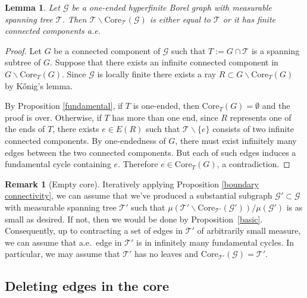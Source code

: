 \documentclass[letterpaper,11pt,reqno]{amsart}
\theoremstyle{bfnote}
\newtheorem{lemma}[theorem]{Lemma}
\theoremstyle{definition}
\newtheorem{remark}[theorem]{Remark}
\newcommand{\0}{\varnothing}
\numberwithin{equation}{section}
\begin{document}
\begin{lemma}\label{nocore}
    Let $\mathcal{G}$ be a one-ended hyperfinite Borel graph with measurable spanning tree $\mathcal{T}$. Then {$\mathcal T \backslash \mathrm{Core}_{\mathcal{T}}(\mathcal{G})$} is either equal to $\mathcal{T}$ or it has finite connected components a.e.
\end{lemma}
\begin{proof}
    Let $G$ be a connected component of $\mathcal G$ such that $T := G\cap \mathcal T$ is a spanning subtree of $G$. Suppose that there exists an infinite connected component in $G\backslash \mathrm{Core}_{T}(G)$. Since $\mathcal G$ is locally finite there exists a ray $R \subset G \backslash \mathrm{Core}_{T}(G)$ by K\H{o}nig's lemma. 
    
    By Proposition \ref{fundamental}, if $T$ is one-ended, then $\mathrm{Core}_{T}(G) = \emptyset$ and the proof is over. Otherwise, if $T$ has more than one end, since $R$ represents one of the ends of $T$, there exists $e \in E(R)$ such that $\mathcal T \backslash \{e\}$ consists of two infinite connected components. By one-endedness of $G$, there must exist infinitely many edges between the two connected components. But each of such edges induces a fundamental cycle containing $e$. Therefore $e \in \mathrm{Core}_{T}(G)$, a contradiction.
\end{proof}

\begin{remark}[Empty core]\label{nocore}
Iteratively applying Proposition \ref{boundary connectivity}, we can assume that we've produced a substantial subgraph $\mathcal{G}'\subset \mathcal{G}$ with measurable spanning tree $\mathcal T'$ such that $\mu(\mathcal T' \backslash \mathrm{Core}_{\mathcal{T}'}(\mathcal{G}'))/\mu(\mathcal{G}')$ is as small as desired.  If not, then we would be done by Proposition~\ref{basic}.  Consequently, up to contracting a set of edges in $\mathcal{T}'$ of arbitrarily small measure, we can assume that a.e.\ edge in $\mathcal{T}'$ is in infinitely many fundamental cycles.  In particular, we may assume that $\mathcal{T}'$ has no leaves and $\mathrm{Core}_{\mathcal{T}'}(\mathcal{G})=\mathcal T'$.
\end{remark}




\subsection{Deleting edges in the core}\label{infinite}
\end{document}
